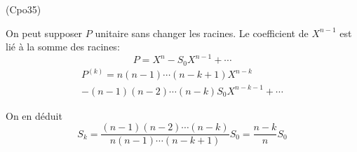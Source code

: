 \begin{tiny}(Cpo35)\end{tiny} On peut supposer $P$ unitaire sans changer les racines. Le coefficient de $X^{n-1}$ est lié à la somme des racines:
\begin{displaymath}
 P = X^n - S_0 X^{n-1}+ \cdots
\end{displaymath}
\begin{multline*}
 P^{(k)} = n(n-1)\cdots(n-k+1)X^{n-k}\\-(n-1)(n-2)\cdots(n-k)S_0X^{n-k-1}+\cdots
\end{multline*}

On en déduit
\begin{displaymath}
 S_k=
\frac{(n-1)(n-2)\cdots(n-k)}{n(n-1)\cdots(n-k+1)}S_0
= \frac{n-k}{n}S_0
\end{displaymath}
